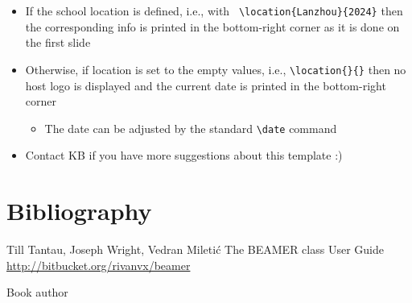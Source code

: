 \documentclass[aspectratio=169]{beamer}
\begin{document}
\begin{frame}{\secname}
{     \begin{itemize}
       \item If the school location is defined, i.e., with {\tt
         \textbackslash location\{Lanzhou\}\{2024\}} then the
         corresponding info is printed in the bottom-right corner as
         it is done on the first slide
       \item Otherwise, if location is set to the empty values, i.e.,
         {\tt \textbackslash location\{\}\{\}} then no host logo is
         displayed and the current date is printed in the bottom-right
         corner
         \begin{itemize}
         \item The date can be adjusted by the standard {\tt \textbackslash date} command
         \end{itemize}
       \item Contact KB if you have more suggestions about this template :)
     \end{itemize}

   }
 \end{frame}

 \section{Bibliography}
 \begin{frame}{\secname}
   \begin{thebibliography}{3}
     \beamertemplatearticlebibitems
     Till Tantau, Joseph Wright, Vedran Mileti\'c
     \newblock The BEAMER class User Guide
     \newblock \href{http://bitbucket.org/rivanvx/beamer}{http://bitbucket.org/rivanvx/beamer}

     \beamertemplatebookbibitems
     Book author
   \end{thebibliography}
 \end{frame}

 \finalpage
\end{document}
